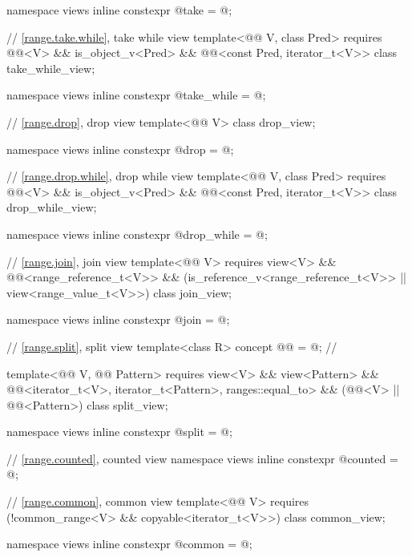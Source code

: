 \begin{codeblock}
{  namespace views { inline constexpr @\unspec@ take = @\unspec@; }

  // \ref{range.take.while}, take while view
  template<@@ V, class Pred>
    requires @@<V> && is_object_v<Pred> &&
             @@<const Pred, iterator_t<V>>
    class take_while_view;

  namespace views { inline constexpr @\unspec@ take_while = @\unspec@; }

  // \ref{range.drop}, drop view
  template<@@ V>
    class drop_view;

  namespace views { inline constexpr @\unspec@ drop = @\unspec@; }

  // \ref{range.drop.while}, drop while view
  template<@@ V, class Pred>
    requires @@<V> && is_object_v<Pred> &&
             @@<const Pred, iterator_t<V>>
    class drop_while_view;

  namespace views { inline constexpr @\unspec@ drop_while = @\unspec@; }

  // \ref{range.join}, join view
  template<@@ V>
    requires view<V> && @@<range_reference_t<V>> &&
             (is_reference_v<range_reference_t<V>> ||
              view<range_value_t<V>>)
  class join_view;

  namespace views { inline constexpr @\unspec@ join = @\unspec@; }

  // \ref{range.split}, split view
  template<class R>
    concept @@ = @\seebelow@;   // \expos

  template<@@ V, @@ Pattern>
    requires view<V> && view<Pattern> &&
             @@<iterator_t<V>, iterator_t<Pattern>, ranges::equal_to> &&
             (@@<V> || @@<Pattern>)
  class split_view;

  namespace views { inline constexpr @\unspec@ split = @\unspec@; }

  // \ref{range.counted}, counted view
  namespace views { inline constexpr @\unspec@ counted = @\unspec@; }

  // \ref{range.common}, common view
  template<@@ V>
    requires (!common_range<V> && copyable<iterator_t<V>>)
  class common_view;

  namespace views { inline constexpr @\unspec@ common = @\unspec@; }

}
\end{codeblock}
